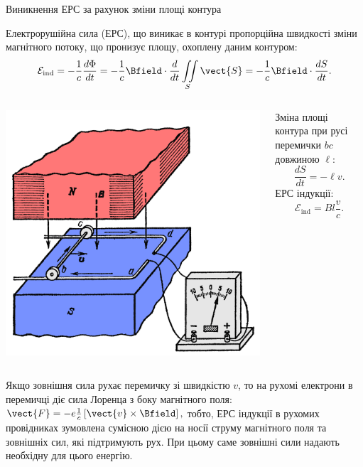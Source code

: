 \documentclass[onlytextwidth]{beamer}
\begin{document}
\begin{frame}{Виникнення ЕРС за рахунок зміни площі контура}{}\small
	\begin{block}{}\justifying
		Електрорушійна сила (ЕРС), що виникає в контурі пропорційна швидкості зміни магнітного потоку, що пронизує площу, охоплену даним контуром:
		\begin{equation*}
			\mathcal{E}_\text{ind} =  -\frac1c \frac{d\Phi}{dt} = -\frac1c \Bfield\cdot \frac{d}{dt} \iint\limits_S \vect{S} = -\frac1c \Bfield\cdot
			\frac{dS}{dt}.
		\end{equation*}
	\end{block}
	\begin{columns}
		\begin{column}{0.4\linewidth}\centering
			\includegraphics[width=0.85\linewidth]{Area_change}
		\end{column}
		\begin{column}{0.6\linewidth}
			\begin{block}{}\justifying
				Зміна площі контура при русі перемички $bc$ довжиною $\ell$:
				\begin{equation*}
					\frac{dS}{dt} = -\ell v.
				\end{equation*}
				ЕРС індукції:
				\begin{equation*}
					\mathcal{E}_\text{ind} = Bl\frac{v}{c}.
				\end{equation*}
			\end{block}
		\end{column}
	\end{columns}
	\begin{block}{}\justifying
		Якщо зовнішня сила рухає перемичку зі швидкістю $v$, то на рухомі електрони в перемичці діє сила Лоренца з боку магнітного поля:
		\(
		\vect{F} = -e\frac1c\left[\vect{v}\times\Bfield\right],
		\)
		тобто, ЕРС індукції в рухомих провідниках зумовлена сумісною дією на носії струму магнітного поля та зовнішніх сил, які підтримують рух. При
		цьому саме зовнішні сили надають необхідну для цього енергію.
	\end{block}
\end{frame}
\end{document}

